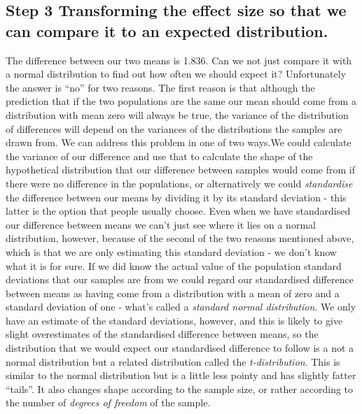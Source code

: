 \documentclass[
]{book}
\begin{document}
\hypertarget{step-3-transforming-the-effect-size-so-that-we-can-compare-it-to-an-expected-distribution.}{%
\subsection{Step 3 Transforming the effect size so that we can compare it to an expected distribution.}\label{step-3-transforming-the-effect-size-so-that-we-can-compare-it-to-an-expected-distribution.}}

The difference between our two means is 1.836. Can we not just compare it with a normal distribution to find out how often we should expect it? Unfortunately the answer is ``no'' for two reasons. The first reason is that although the prediction that if the two populations are the same our mean should come from a distribution with mean zero will always be true, the variance of the distribution of differences will depend on the variances of the distributions the samples are drawn from. We can address this problem in one of two ways.We could calculate the variance of our difference and use that to calculate the shape of the hypothetical distribution that our difference between samples would come from if there were no difference in the populations, or alternatively we could \emph{standardise} the difference between our means by dividing it by its standard deviation - this latter is the option that people usually choose. Even when we have standardised our difference between means we can't just see where it lies on a normal distribution, however, because of the second of the two reasons mentioned above, which is that we are only estimating this standard deviation - we don't know what it is for sure. If we did know the actual value of the population standard deviations that our samples are from we could regard our standardised difference between means as having come from a distribution with a mean of zero and a standard deviation of one - what's called a \emph{standard normal distribution}. We only have an estimate of the standard deviations, however, and this is likely to give slight overestimates of the standardised difference between means, so the distribution that we would expect our standardised difference to follow is a not a normal distribution but a related distribution called the \emph{t-distribution}. This is similar to the normal distribution but is a little less pointy and has slightly fatter ``tails''. It also changes shape according to the sample size, or rather according to the number of \emph{degrees of freedom} of the sample.
\end{document}
